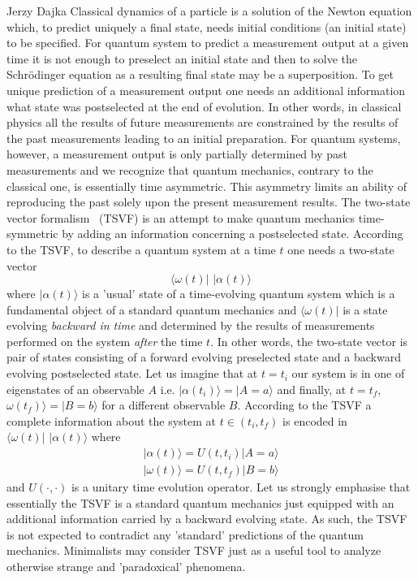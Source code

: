 \begin{artengenv}{Jerzy Dajka}
Classical dynamics of a particle is a solution of the Newton equation which, to predict uniquely a final state, needs initial conditions (an initial state) to be specified. For quantum system to predict a measurement output at a given time it is not enough to preselect an initial state and then to solve the Schr\"{o}dinger equation as a resulting final state may be a superposition. To get unique prediction of a measurement output one needs an additional information what state was postselected at the end of evolution.  In other words, in classical physics all the results of future measurements are constrained by the results of the past measurements leading to an initial preparation. For quantum systems, however, a measurement output is only partially determined by past measurements and we recognize that quantum mechanics, contrary to the classical one, is essentially time asymmetric. This asymmetry limits an ability of reproducing the  past solely upon the present measurement results. The two-state vector formalism~\parencite{Aharonov2008} (TSVF) is an attempt to make quantum mechanics time-symmetric by adding an information concerning a postselected state. According to the TSVF, to describe a quantum system at a time $t$ one needs a two-state vector
\begin{equation}\label{tsv}
    \langle \omega(t)|\,\,|\alpha(t)\rangle
\end{equation}
where $|\alpha(t)\rangle$ is a 'usual' state of a time-evolving quantum system which is a fundamental object of a standard quantum mechanics and $\langle\omega(t)|$ is a state evolving {\it backward in time} and  determined by the results of measurements performed on the system {\it after} the time $t$. In other words, the two-state vector is pair of states consisting of   a forward evolving preselected state  and a backward evolving postselected state. 
Let us imagine that at $t=t_i$ our system is in one of eigenstates of an observable $A$ i.e. $|\alpha(t_i)\rangle=|A=a\rangle$ and finally, at $t=t_f$, $\omega(t_f)\rangle=|B=b\rangle$ for a different observable $B$. According to the TSVF a complete information about the system at $t\in(t_i,t_f)$ is encoded in $\langle \omega(t)|\,\,|\alpha(t)\rangle$ where
\begin{equation}
   \begin{split}
       |\alpha(t)\rangle = U(t,t_i)|A=a\rangle\\
       |\omega(t)\rangle= U(t,t_f)|B=b\rangle
   \end{split}
\end{equation}
and $U(\cdot,\cdot)$ is a unitary time evolution operator. 
Let us strongly emphasise that essentially the TSVF is a standard quantum mechanics just equipped with an additional information carried by a backward evolving state. As such, the TSVF is not expected to contradict any 'standard' predictions of the quantum mechanics.  Minimalists may consider TSVF just as a useful tool to analyze otherwise strange and 'paradoxical' phenomena.   



\end{artengenv}
